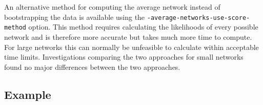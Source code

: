 \documentclass[a4paper,12pt]{article}
\newcommand{\code}[1]{{\footnotesize{{\tt #1}}}}
\begin{document}
An alternative method for computing the average network instead of bootstrapping the data is available using the \code{-average-networks-use-score-method} option. This method requires calculating the likelihoods of every possible network and is therefore more accurate but takes much more time to compute. For large networks this can normally be unfeasible to calculate within acceptable time limits. Investigations comparing the two approaches for small networks found no major differences between the two approaches. 


\subsection{Example}
\label{average-network-example}
\end{document}
